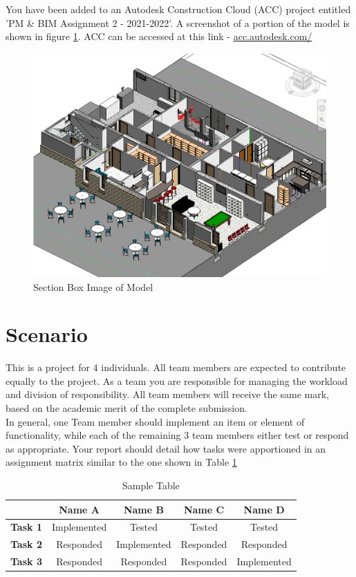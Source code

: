 You have been added to an Autodesk Construction Cloud (ACC) project entitled 'PM \& BIM Assignment 2 - 2021-2022'.  A screenshot of a portion of the model is shown in figure \ref{fig:thumbnail}.  ACC can be accessed at this link - \href{https://acc.autodesk.com/}{acc.autodesk.com/}

\begin{figure}
	\centering
	\includegraphics[width=0.7\linewidth]{RevitAssets/Thumbnail}
	\caption[Section Box Image of Model]{Section Box Image of Model}
	\label{fig:thumbnail}
\end{figure}





\section*{Scenario}



This is a project for 4 individuals. All team members are expected to contribute equally to the project. As a team you are responsible for managing the workload and division of responsibility. All team members will receive the same mark, based on the academic merit of the complete submission.\\


In general, one Team member should implement an item or element of functionality, while each of the remaining 3 team members either test or respond as appropriate.  Your report should detail how tasks were apportioned in an assignment matrix similar to the one shown in Table \ref{tab:AM}

\begin{table}[ht]
	\centering
	\begin{tabular}{|l|c|c|c|c|}
		\hline
		& \textbf{Name A} & \textbf{Name B} & \textbf{Name C} & \textbf{Name D} \\
		\hline
		\textbf{Task 1} & Implemented & Tested & Tested & Tested \\
		\hline
		\textbf{Task 2} & Responded & Implemented & Responded & Responded \\
		\hline
		\textbf{Task 3} & Responded & Responded & Responded & Implemented \\
		\hline
	
	\end{tabular}
	\caption{Sample Table}
	\label{tab:AM}
\end{table}





